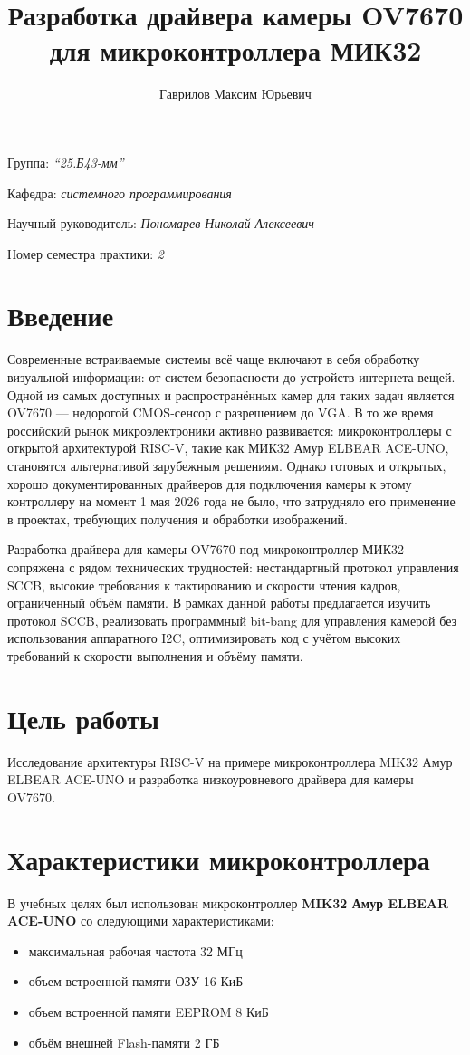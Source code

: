 \documentclass[a4paper]{article}
\title{Разработка драйвера камеры OV7670 для микроконтроллера МИК32}
\author{Гаврилов Максим Юрьевич}
\date{}
\begin{document}
\maketitle

\begin{flushright}
    Группа: \emph{\enquote{25.Б43-мм}}

    Кафедра: \emph{системного программирования}

    Научный руководитель: \emph{Пономарев Николай Алексеевич}
    
    Номер семестра практики: \emph{2}
\end{flushright}

\section{Введение}
Современные встраиваемые системы всё чаще включают в себя обработку визуальной информации: от систем безопасности до устройств интернета вещей.
Одной из самых доступных и распространённых камер для таких задач является OV7670 — недорогой CMOS-сенсор с разрешением до VGA.
В то же время российский рынок микроэлектроники активно развивается: микроконтроллеры с открытой архитектурой RISC-V, такие как МИК32 Амур ELBEAR ACE-UNO, становятся альтернативой зарубежным решениям.
Однако готовых и открытых, хорошо документированных драйверов для подключения камеры к этому контроллеру на момент 1 мая 2026 года не было, что затрудняло его применение в проектах, требующих получения и обработки изображений.

Разработка драйвера для камеры OV7670 под микроконтроллер МИК32 сопряжена с рядом технических трудностей:
нестандартный протокол управления SCCB, высокие требования к тактированию и скорости чтения кадров, ограниченный объём памяти.
В рамках данной работы предлагается изучить протокол SCCB, реализовать программный bit-bang для управления камерой без использования аппаратного I2C, оптимизировать код с учётом высоких требований к скорости выполнения и объёму памяти.

\section{Цель работы}
Исследование архитектуры RISC-V на примере микроконтроллера MIK32 Амур ELBEAR ACE-UNO и разработка низкоуровневого драйвера для камеры OV7670.

\section{Характеристики микроконтроллера}
В учебных целях был использован микроконтроллер 
\textbf{MIK32 Амур ELBEAR ACE-UNO} со следующими характеристиками:
\begin{itemize}
    \item максимальная рабочая частота 32 МГц
    \item объем встроенной памяти ОЗУ 16 КиБ
    \item объем встроенной памяти EEPROM 8 КиБ
    \item объём внешней Flash-памяти 2 ГБ
\end{itemize}
\end{document}
